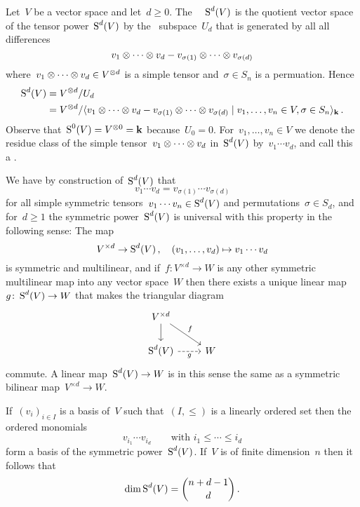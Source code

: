 \begin{recall}
  Let~$V$ be a vector space and let~$d \geq 0$.
  The~{} ~$\operatorname{S}^d(V)$ is the quotient vector space of the tensor power~$\operatorname{S}^d(V)$ by the~{\linear{$\kf$}} subspace~$U_d$ that is generated by all all differences
  \[
      v_1 \otimes \dotsb \otimes v_d
    - v_{\sigma(1)} \otimes \dotsb \otimes v_{\sigma(d)}
  \]
  where~$v_1 \otimes \dotsb \otimes v_d \in V^{\otimes d}$ is a simple tensor and~$\sigma \in S_n$ is a permuation.
  Hence
  \begin{align*}
    \Symm^d(V)
    &=
    V^{\tensor d} / U_d
    \\
    &=
    V^{\tensor d}
    /
    \gen{
        v_1 \tensor \dotsb \tensor v_d
      - v_{\sigma(1)} \tensor \dotsb \tensor v_{\sigma(d)} 
    \suchthat
      v_1, \dotsc, v_n \in V,
      \sigma \in S_n
    }_{\kf} \,.
  \end{align*}
  Observe that~$\operatorname{S}^0(V) = V^{\otimes 0} = \mathbf{k}$ because~$U_0 = 0$.
  For~$v_1, \dotsc, v_n \in V$ we denote the residue class of the simple tensor~$v_1 \otimes \dotsb \otimes v_d$ in~$\operatorname{S}^d(V)$ by~$v_1 \dotsm v_d$, and call this a .
  
  We have by construction of~$\operatorname{S}^d(V)$ that
  \[
    v_1 \dotsm v_d
    =
    v_{\sigma(1)} \dotsm v_{\sigma(d)}
  \]
  for all simple symmetric tensors~$v_1 \dotsm v_n \in \operatorname{S}^d(V)$ and permutations~$\sigma \in S_d$, and for~$d \geq 1$ the symmetric power~$\operatorname{S}^d(V)$ is universal with this property in the following sense:
  The map
  \[
    V^{\times d}
    \to
    \operatorname{S}^d(V)  \,,
    \quad
    (v_1, \dotsc, v_d)
    \mapsto
    v_1 \dotsm v_d
  \]
  is symmetric and multilinear, and if~$f \colon V^{\times d} \to W$ is any other symmetric multilinear map into any vector space~$W$ then there exists a unique linear map~$g \colon \operatorname{S}^d(V) \to W$ that makes the triangular diagram
  \[
    \begin{tikzcd}
      V^{\times d}
      \arrow{d}
      \arrow{dr}[above right]{f}
      &
      {}
      \\
      \Symm^d(V)
      \arrow[dashed]{r}[below]{g}
      &
      W
    \end{tikzcd}
  \]
  commute.
  A linear map~$\operatorname{S}^d(V) \to W$ is in this sense the same as a symmetric bilinear map~$V^{\times d} \to W$.
  
  If~$(v_i)_{i \in I}$ is a basis of~$V$ such that~$(I, \leq)$ is a linearly ordered set then the ordered monomials
  \[
    v_{i_1} \dotsm v_{i_d}
    \qquad
    \text{with~$i_1 \leq \dotsb \leq i_d$}
  \]
  form a basis of the symmetric power~$\operatorname{S}^d(V)$.
  If~$V$ is of finite dimension~$n$ then it follows that
  \[
    \dim \operatorname{S}^d(V)
    =
    \binom{n+d-1}{d}  \,.
  \]
\end{recall}


